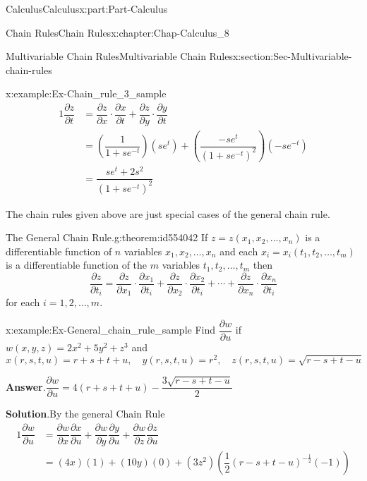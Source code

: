\documentclass[oneside,10pt,]{book}
\newcommand{\blocktitlefont}{\relax}
\numberwithin{equation}{section}
\newcommand{\amp}{&}
\begin{document}
\begin{partptx}{Calculus}{}{Calculus}{}{}{x:part:Part-Calculus}
\begin{chapterptx}{Chain Rules}{}{Chain Rules}{}{}{x:chapter:Chap-Calculus_8}
\begin{sectionptx}{Multivariable Chain Rules}{}{Multivariable Chain Rules}{}{}{x:section:Sec-Multivariable-chain-rules}
\begin{example}{}{x:example:Ex-Chain_rule_3_sample}
\begin{alignat*}{1}
\dfrac{\partial z}{\partial t} \amp = \dfrac{\partial z}{\partial x} \cdot \dfrac{\partial x}{\partial t} + \dfrac{\partial z}{\partial y} \cdot \dfrac{\partial y}{\partial t}\\
\amp =  \left(\dfrac{1}{1+se^{-t}}\right)(se^t) + \left(\dfrac{-se^t}{(1+se^{-t})^2}\right)(-se^{-t})\\
\amp =  \dfrac{se^t + 2s^2}{(1+se^{-t})^2}
\end{alignat*}
%
\end{example}
The chain rules given above are just special cases of the general chain rule.%
\begin{theorem}{The General Chain Rule.}{}{g:theorem:id554042}%
If \(z=z(x_1,x_2,\ldots,x_n)\) is a differentiable function of \(n\) variables \(x_1,x_2,\ldots,x_n\) and each \(x_i = x_i(t_1,t_2,\ldots,t_m)\) is a differentiable function of the \(m\) variables \(t_1,t_2,\ldots,t_m\) then%
\begin{equation*}
\dfrac{\partial z}{\partial t_i} = \dfrac{\partial z}{\partial x_1} \cdot \dfrac{\partial x_1}{\partial t_i} + \dfrac{\partial z}{\partial x_2} \cdot \dfrac{\partial x_2}{\partial t_i} + \cdots + \dfrac{\partial z}{\partial x_n} \cdot \dfrac{\partial x_n}{\partial t_i}
\end{equation*}
for each \(i = 1,2,\ldots, m.\)%
\end{theorem}
\begin{example}{}{x:example:Ex-General_chain_rule_sample}%
Find \(\dfrac{\partial w}{\partial u}\) if \(w(x,y,z) = 2x^2+5y^2+z^3\) and%
\begin{equation*}
x(r,s,t,u) = r+s+t+u, \quad y(r,s,t,u)=r^2,\quad z(r,s,t,u) = \sqrt{r-s+t-u}
\end{equation*}
%
\par\smallskip%
\noindent\textbf{\blocktitlefont Answer}.\hypertarget{g:answer:id551826}{}\quad{}\(\dfrac{\partial w}{\partial u} = 4(r+s+t+u) - \dfrac{3\sqrt{r-s+t-u}}{2}\)%
\par\smallskip%
\noindent\textbf{\blocktitlefont Solution}.\hypertarget{g:solution:id551842}{}\quad{}By the general Chain Rule%
\begin{alignat*}{1}
\dfrac{\partial w}{\partial u} \amp = \dfrac{\partial w}{\partial x}\dfrac{\partial x}{\partial u} + \dfrac{\partial w}{\partial y}\dfrac{\partial y}{\partial u} + \dfrac{\partial w}{\partial z}\dfrac{\partial z}{\partial u}\\
\amp =  (4x)(1) + (10y)(0) + (3z^2)\left(\dfrac{1}{2}(r-s+t-u)^{-\frac{1}{2}}(-1)\right)\\

\end{alignat*}
\end{example}
\end{sectionptx}
\end{chapterptx}
\end{partptx}
\end{document}
